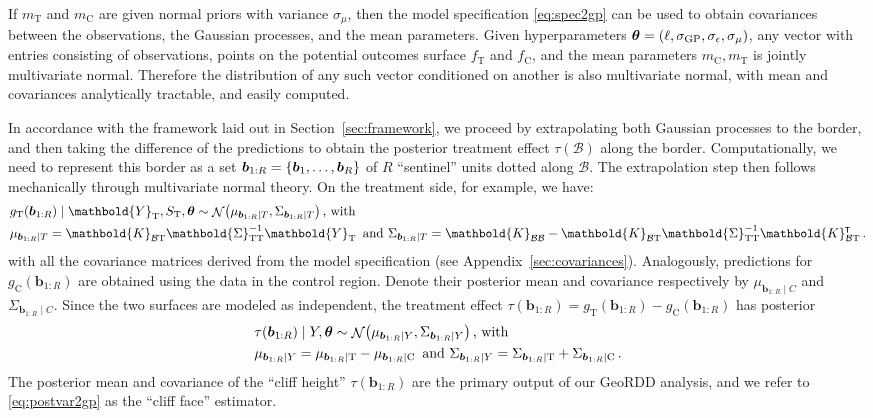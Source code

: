 \documentclass[letter,12pt]{article}
\DeclarePairedDelimiter{\parenthesis}{\lparen}{\rparen}
\DeclarePairedDelimiter{\curlybracket}{\lbrace}{\rbrace}
\newcommand{\del}[1]{\parenthesis*{#1}}
\newcommand{\cbr}[1]{\curlybracket*{#1}}
\DeclareMathOperator{\normal}{\mathcal{N}}
\newcommand*{\trans}{^{\mkern-1.5mu\intercal}}
\newcommand{\treat}{\mathrm{T}}
\newcommand{\ctrol}{\mathrm{C}}
\newcommand{\sigmaf}{\sigma_{\mathrm{GP}}}
\newcommand{\sigman}{\sigma_{\epsilon}}
\newcommand{\sigmamu}{\sigma_{\mu}}
\newcommand{\Yvec}{\mathbold{Y}}
\newcommand{\yt}{\Yvec_{\treat}}
\newcommand{\border}{\mathcal{B}}
\newcommand{\sentinel}{\bm{b}}
\newcommand{\numsent}{R}
\newcommand{\sentinels}{\sentinel_{1:\numsent}}
\newcommand{\sentinelset}{\cbr{\sentinel_1,\ldots,\sentinel_\numsent}}
\newcommand{\hyperparam}{\bm{\theta}}
\newcommand{\Kmat}{\mathbold{K}}
\newcommand{\SigmaMat}{\mathbold{\Sigma}}
\newcommand{\KBB}{\Kmat_{\border \border}}
\newcommand{\KBT}{\Kmat_{\border \treat}}
\newcommand{\STT}{\SigmaMat_{\treat \treat}}
\begin{document}
If \(m_\treat\) and \(m_\ctrol\) are given normal priors with variance \(\sigmamu\), then the model specification \eqref{eq:spec2gp} can be used to obtain covariances between the observations, the Gaussian processes, and the mean parameters.
Given hyperparameters \(\hyperparam = \del{\ell,\sigmaf, \sigman, \sigmamu}\), any vector with entries consisting of observations, points on the potential outcomes surface \(f_{\treat}\) and \(f_{\ctrol}\), and the mean parameters \(m_{\ctrol}, m_{\treat}\) is jointly multivariate normal. Therefore the distribution of any such vector conditioned on another is also multivariate normal, with mean and covariances analytically tractable, and easily computed.



In accordance with the framework laid out in Section~\ref{sec:framework}, we proceed by extrapolating both Gaussian processes to the border,
and then taking the difference of the predictions to obtain the posterior treatment effect \(\tau(\border)\) along the border.
Computationally, we need to represent this border as a set \(\sentinels=\sentinelset\) of \(\numsent\) ``sentinel'' units dotted along \(\border\).
The extrapolation step then follows mechanically through multivariate normal theory.
On the treatment side, for example, we have:
\begin{equation}\begin{split}
    & g_\treat{}(\sentinels) \mid \yt{}, S_\treat{}, \hyperparam \sim \normal\del{\mu_{\sentinels \mid T}, \Sigma_{\sentinels \mid T}} \,\text{, with} \\
    & \mu_{\sentinels \mid T} =
    \KBT
    \STT^{-1} 
    \yt{} 
    \,\text{ and } 
    \Sigma_{\sentinels \mid T} =
    \KBB - \KBT \STT^{-1} \KBT\trans \,.
\end{split}
\label{eq:postvar2gp_t_or_c}
\end{equation}
with all the covariance matrices derived from the model specification (see Appendix~\ref{sec:covariances}).
Analogously, predictions for \(g_\ctrol{}(\sentinels)\) are obtained using the data in the control region.
Denote their posterior mean and covariance respectively by \(\mu_{\sentinels \mid C}\) and \(\Sigma_{\sentinels \mid C}\).
Since the two surfaces are modeled as independent, the treatment effect \(\tau(\sentinels)=g_\treat{}(\sentinels)-g_\ctrol{}(\sentinels)\) has posterior
\begin{equation}
    \begin{split}
        & \tau(\sentinels) \mid Y, \hyperparam \sim \normal\del{\mu_{\sentinels \mid Y}, \Sigma_{\sentinels \mid Y}} \,\text{, with}\\
        & \mu_{\sentinels \mid Y} = \mu_{\sentinels \mid \treat} - \mu_{\sentinels \mid \ctrol} \,\text{ and }
        \Sigma_{\sentinels \mid Y} = \Sigma_{\sentinels \mid \treat} + \Sigma_{\sentinels \mid \ctrol} \,.
    \end{split}
    \label{eq:postvar2gp}
\end{equation}
The posterior mean and covariance of the ``cliff height'' \(\tau(\sentinels)\) are the primary output of our GeoRDD analysis, and we refer to \eqref{eq:postvar2gp} as the ``cliff face'' estimator.
\end{document}
